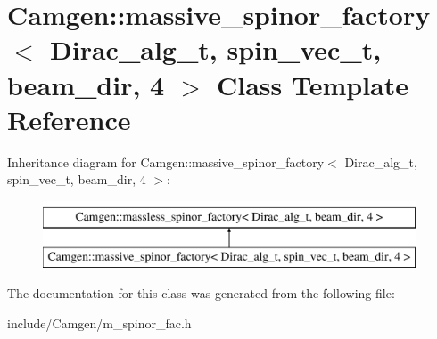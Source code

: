 \hypertarget{a00348}{}\section{Camgen\+:\+:massive\+\_\+spinor\+\_\+factory$<$ Dirac\+\_\+alg\+\_\+t, spin\+\_\+vec\+\_\+t, beam\+\_\+dir, 4 $>$ Class Template Reference}
\label{a00348}
Inheritance diagram for Camgen\+:\+:massive\+\_\+spinor\+\_\+factory$<$ Dirac\+\_\+alg\+\_\+t, spin\+\_\+vec\+\_\+t, beam\+\_\+dir, 4 $>$\+:\begin{figure}[H]
\begin{center}
\leavevmode
\includegraphics[height=2.000000cm]{a00348}
\end{center}
\end{figure}


The documentation for this class was generated from the following file\+:\begin{DoxyCompactItemize}
\item 
include/\+Camgen/m\+\_\+spinor\+\_\+fac.\+h\end{DoxyCompactItemize}
